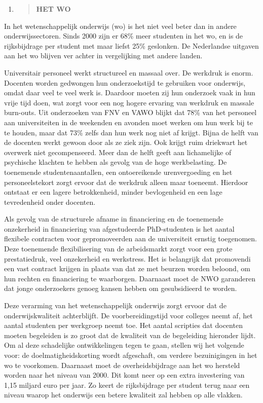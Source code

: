\begin{enumerate}
\def\labelenumi{\arabic{enumi}.}
\setcounter{enumi}{9}
\item
  \begin{quote}
  \textbf{HET WO}
  \end{quote}
\end{enumerate}

In het wetenschappelijk onderwijs (wo) is het niet veel beter dan in
andere onderwijssectoren. Sinds 2000 zijn er 68\% meer studenten in het
wo, en is de rijksbijdrage per student met maar liefst 25\% geslonken.
De Nederlandse uitgaven aan het wo blijven ver achter in vergelijking
met andere landen.

Universitair personeel werkt structureel en massaal over. De werkdruk is
enorm. Docenten worden gedwongen hun onderzoekstijd te gebruiken voor
onderwijs, omdat daar veel te veel werk is. Daardoor moeten zij hun
onderzoek vaak in hun vrije tijd doen, wat zorgt voor een nog hogere
ervaring van werkdruk en massale burn-outs. Uit onderzoeken van FNV en
VAWO blijkt dat 78\% van het personeel aan universiteiten in de
weekenden en avonden moet werken om hun werk bij te te houden, maar dat
73\% zelfs dan hun werk nog niet af krijgt. Bijna de helft van de
docenten werkt gewoon door als ze ziek zijn. Ook krijgt ruim driekwart
het overwerk niet gecompenseerd. Meer dan de helft geeft aan
lichamelijke of psychische klachten te hebben als gevolg van de hoge
werkbelasting. De toenemende studentenaantallen, een ontoereikende
urenvergoeding en het personeelstekort zorgt ervoor dat de werkdruk
alleen maar toeneemt. Hierdoor ontstaat er een lagere betrokkenheid,
minder bevlogenheid en een lage tevredenheid onder docenten.

Als gevolg van de structurele afname in financiering en de toenemende
onzekerheid in financiering van afgestudeerde PhD-studenten is het
aantal flexibele contracten voor gepromoveerden aan de universiteit
ernstig toegenomen. Deze toenemende flexibilisering van de arbeidsmarkt
zorgt voor een grote prestatiedruk, veel onzekerheid en werkstress. Het
is belangrijk dat promovendi een vast contract krijgen in plaats van dat
ze met beurzen worden beloond, om hun rechten en financiering te
waarborgen. Daarnaast moet de NWO garanderen dat jonge onderzoekers
genoeg kansen hebben om gesubsidieerd te worden.

Deze verarming van het wetenschappelijk onderwijs zorgt ervoor dat de
onderwijskwaliteit achterblijft. De voorbereidingstijd voor colleges
neemt af, het aantal studenten per werkgroep neemt toe. Het aantal
scripties dat docenten moeten begeleiden is zo groot dat de kwaliteit
van de begeleiding hieronder lijdt. Om al deze schadelijke
ontwikkelingen tegen te gaan, stellen wij het volgende voor: de
doelmatigheidskorting wordt afgeschaft, om verdere bezuinigingen in het
wo te voorkomen. Daarnaast moet de overheidsbijdrage aan het wo hersteld
worden naar het niveau van 2000. Dit komt neer op een extra investering
van 1,15 miljard euro per jaar. Zo keert de rijksbijdrage per student
terug naar een niveau waarop het onderwijs een betere kwaliteit zal
hebben op alle vlakken.

